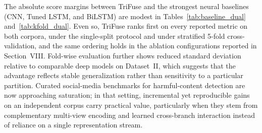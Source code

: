 \documentclass[journal]{IEEEtran}
\begin{document}
\begin{table}[!t]
\caption{Stratified 5-Fold Cross-Validation Results (mean\,$\pm$\,std)}
\label{tab:kfold_dual}
\centering
{}
\end{table}

The absolute score margins between TriFuse and the strongest neural baselines (CNN, Tuned LSTM, and BiLSTM) are modest in Tables~\ref{tab:baseline_dual} and~\ref{tab:kfold_dual}. Even so, TriFuse ranks first on every reported metric on both corpora, under the single-split protocol and under stratified 5-fold cross-validation, and the same ordering holds in the ablation configurations reported in Section~VIII. Fold-wise evaluation further shows reduced standard deviation relative to comparable deep models on Dataset~II, which suggests that the advantage reflects stable generalization rather than sensitivity to a particular partition. Curated social-media benchmarks for harmful-content detection are now approaching saturation; in that setting, incremental yet reproducible gains on an independent corpus carry practical value, particularly when they stem from complementary multi-view encoding and learned cross-branch interaction instead of reliance on a single representation stream.
\end{document}
